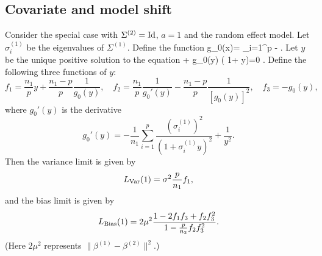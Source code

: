 \subsection{Covariate and model shift}\label{sec3_combined}

Consider the special case with $\Sigma^{(2)}=\operatorname{Id}$, $a=1$ and the random effect model. Let $\sigma_i^{(1)}$ be the eigenvalues of $\Sigma^{(1)}$. Define the function 
\be\label{g1new} g_0(x)= \sum_{i=1}^p  - .\ee
Let $y$ be the unique positive solution to the equation 
\be\nonumber
{} + g_0(y) \cdot \left( 1+    y\right)=0 .
\ee
Define the following three functions of $y$:
$$f_1= \frac{n_1}{p}y + \frac{n_1-p}{p}\frac1{g_0(y)},\quad f_2= \frac{n_1}{p}\frac{1}{g_0'(y)}- \frac{n_1-p}{p}\frac1{[g_0(y)]^2},\quad f_3= - g_0(y),$$
where $g_0'(y)$ is the derivative
$$ g_0'(y)=  -\frac{1}{n_1}\sum_{i=1}^p \frac{(\sigma_i^{(1)})^2}{(1+ \sigma_i^{(1)} y)^2} +\frac{1}{y^2}. $$
Then the variance limit is given by
$$ L_{\operatorname{Var}}(1)=\sigma^2 \frac{p}{n_1}f_1,$$
and the bias limit is given by 
$$ L_{\textup{Bias}}(1)=2\mu^2 \frac{1 - 2f_1 f_3  +f_2 f_3^2  }{ 1 - \frac{p}{n_2}f_2 f_3^2 }.$$
(Here $2\mu^2$ represents $\|\beta^{(1)}-\beta^{(2)}\|^2$.)

